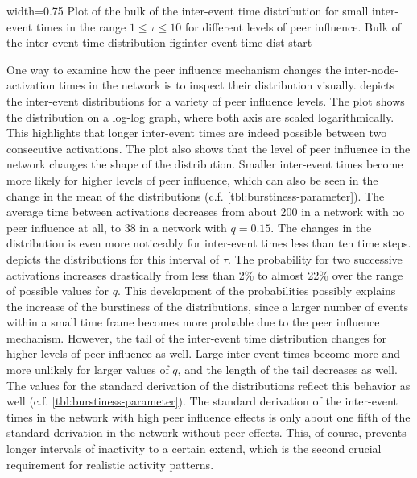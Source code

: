       {width=0.75\textwidth}
      {Plot of the bulk of the inter-event time distribution for small inter-event times in the range \( 1 \leq \tau \leq 10 \) for different levels of peer influence.}
      {Bulk of the inter-event time distribution}
      {fig:inter-event-time-dist-start}


One way to examine how the peer influence mechanism changes the inter-node-activation times in the network is to inspect their distribution visually.
 depicts the inter-event distributions for a variety of peer influence levels.
The plot shows the distribution on a log-log graph, where both axis are scaled logarithmically.
This highlights that longer inter-event times are indeed possible between two consecutive activations.
The plot also shows that the level of peer influence in the network changes the shape of the distribution.
Smaller inter-event times become more likely for higher levels of peer influence, which can also be seen in the change in the mean of the distributions (c.f. \cref{tbl:burstiness-parameter}).
The average time between activations decreases from about 200 in a network with no peer influence at all, to 38 in a network with \( q = 0.15 \).
The changes in the distribution is even more noticeably for inter-event times less than ten time steps.
 depicts the distributions for this interval of \( \tau \).
The probability for two successive activations increases drastically from less than 2\% to almost 22\% over the range of possible values for \( q \).
This development of the probabilities possibly explains the increase of the burstiness of the distributions, since a larger number of events within a small time frame becomes more probable due to the peer influence mechanism.
However, the tail of the inter-event time distribution changes for higher levels of peer influence as well.
Large inter-event times become more and more unlikely for larger values of \( q \), and the length of the tail decreases as well.
The values for the standard derivation of the distributions reflect this behavior as well (c.f. \cref{tbl:burstiness-parameter}).
The standard derivation of the inter-event times in the network with high peer influence effects is only about one fifth of the standard derivation in the network without peer effects.
This, of course, prevents longer intervals of inactivity to a certain extend, which is the second crucial requirement for realistic activity patterns.


